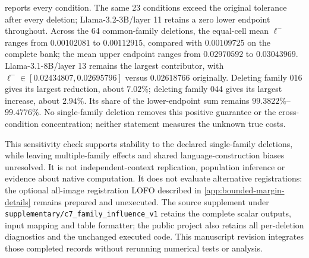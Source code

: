  reports every condition. The same 23 conditions exceed the original tolerance after every deletion; Llama-3.2-3B/layer 11 retains a zero lower endpoint throughout. Across the 64 common-family deletions, the equal-cell mean $\ell^-$ ranges from $0.00102081$ to $0.00112915$, compared with $0.00109725$ on the complete bank; the mean upper endpoint ranges from $0.02970592$ to $0.03043969$. Llama-3.1-8B/layer 13 remains the largest contributor, with $\ell^-\in[0.02434807,0.02695796]$ versus $0.02618766$ originally. Deleting family 016 gives its largest reduction, about $7.02\%$; deleting family 044 gives its largest increase, about $2.94\%$. Its share of the lower-endpoint sum remains $99.3822\%$--$99.4776\%$. No single-family deletion removes this positive guarantee or the cross-condition concentration; neither statement measures the unknown true costs.

This sensitivity check supports stability to the declared single-family deletions, while leaving multiple-family effects and shared language-construction biases unresolved. It is not independent-context replication, population inference or evidence about native computation. It does not evaluate alternative registrations: the optional all-image registration LOFO described in \cref{app:bounded-margin-details} remains prepared and unexecuted. The source supplement under \texttt{supplementary/c7\_family\_influence\_v1} retains the complete scalar outputs, input mapping and table formatter; the public project also retains all per-deletion diagnostics and the unchanged executed code. This manuscript revision integrates those completed records without rerunning numerical tests or analysis.

